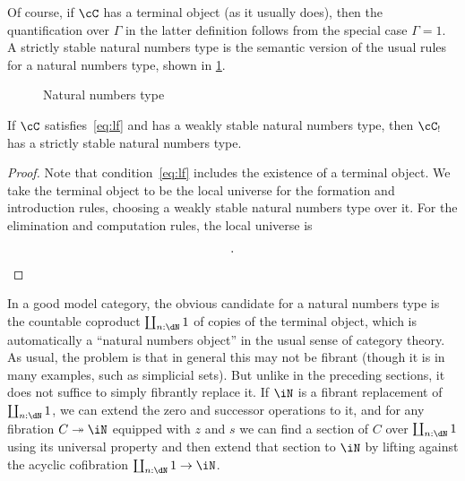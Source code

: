 \documentclass{amsart}
\let\N\iN
\let\C\cC
\def\zero{\mathsf{zero}}
\def\succ{\mathsf{succ}}
\def\nrec{\mathsf{nrec}}
\let\type\fibtype
\begin{document}
Of course, if $\C$ has a terminal object (as it usually does), then the quantification over $\Gamma$ in the latter definition follows from the special case $\Gamma=1$.
A strictly stable natural numbers type is the semantic version of the usual rules for a natural numbers type, shown in \cref{fig:nno}.

\begin{figure}
  \centering
  \caption{Natural numbers type}
  \label{fig:nno}
\end{figure}

\begin{thm}
  If $\C$ satisfies~\eqref{eq:lf} and has a weakly stable natural numbers type, then $\C_!$ has a strictly stable natural numbers type.
\end{thm}
\begin{proof}
  Note that condition~\eqref{eq:lf} includes the existence of a terminal object.
  We take the terminal object to be the local universe for the formation and introduction rules, choosing a weakly stable natural numbers type over it.
  For the elimination and computation rules, the local universe is
  \begin{align*}
    [&c: \prod x:E_{\N}. V_C,\\
    &z: E_C(c(\zero)),\\
    &s: \prod x:E_{\N}, y:E_C(c(x)) . E_C(c(\succ(x))) ].\qedhere
  \end{align*}
\end{proof}

In a good model category, the obvious candidate for a natural numbers type is the countable coproduct $\coprod_{n:\dN} 1$ of copies of the terminal object, which is automatically a ``natural numbers object'' in the usual sense of category theory.
As usual, the problem is that in general this may not be fibrant (though it is in many examples, such as simplicial sets).
But unlike in the preceding sections, it does not suffice to simply fibrantly replace it.
If $\N$ is a fibrant replacement of $\coprod_{n:\dN} 1$, we can extend the zero and successor operations to it, and for any fibration $C\fib\N$ equipped with $z$ and $s$ we can find a section of $C$ over $\coprod_{n:\dN} 1$ using its universal property and then extend that section to $\N$ by lifting against the acyclic cofibration $\coprod_{n:\dN} 1 \to \N$.
\end{document}
